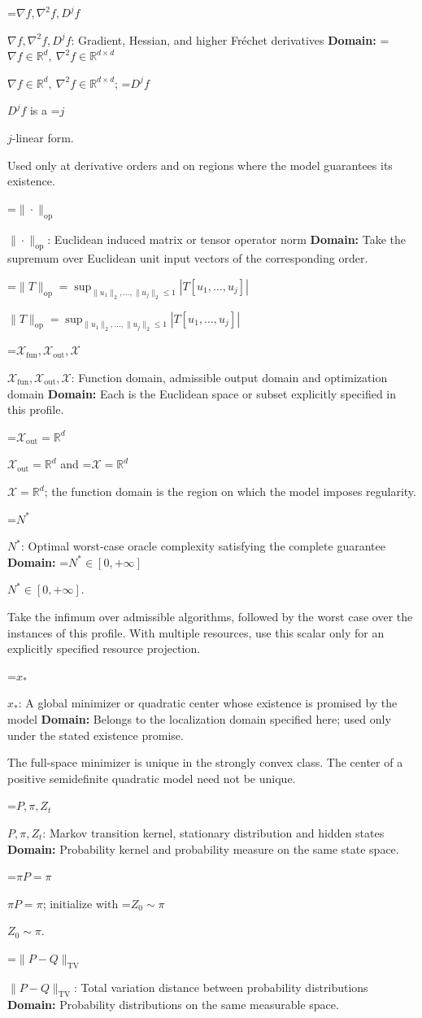 \documentclass[10pt,a4paper]{article}
\newcommand{\AtlasMath}[1]{\par\begingroup\centering\setbox0=\hbox{$\displaystyle #1$}\ifdim\wd0>1.4\linewidth\typeout{ATLAS WIDE FORMULA: \the\wd0}\fi\ifdim\wd0>\linewidth\resizebox{\linewidth}{!}{\box0}\else\box0\fi\par\endgroup}
\newcommand{\AtlasInlineMath}[1]{\begingroup\setbox0=\hbox{$#1$}\ifdim\wd0>.4\linewidth\endgroup\AtlasMath{#1}\else\endgroup$#1$\fi}
\begin{document}
\AtlasInlineMath{\nabla f,\nabla^2f,D^jf}: Gradient, Hessian, and higher Fréchet derivatives \textbf{Domain:} \AtlasInlineMath{\nabla f\in\mathbb{R}^d,\ \nabla^2f\in\mathbb{R}^{d\times d}}; \AtlasInlineMath{D^jf} is a \AtlasInlineMath{j}-linear form.

Used only at derivative orders and on regions where the model guarantees its existence.

\AtlasInlineMath{\|\cdot\|_{\mathrm{op}}}: Euclidean induced matrix or tensor operator norm \textbf{Domain:} Take the supremum over Euclidean unit input vectors of the corresponding order.

\AtlasInlineMath{\|T\|_{\mathrm{op}}=\sup_{\|u_1\|_2,\ldots,\|u_j\|_2\le1}|T[u_1,\ldots,u_j]|}

\AtlasInlineMath{\mathcal{X}_{\mathrm{fun}},\mathcal{X}_{\mathrm{out}},\mathcal{X}}: Function domain, admissible output domain and optimization domain \textbf{Domain:} Each is the Euclidean space or subset explicitly specified in this profile.

\AtlasInlineMath{\mathcal{X}_{\mathrm{out}}=\mathbb{R}^d} and \AtlasInlineMath{\mathcal{X}=\mathbb{R}^d}; the function domain is the region on which the model imposes regularity.

\AtlasInlineMath{N^*}: Optimal worst-case oracle complexity satisfying the complete guarantee \textbf{Domain:} \AtlasInlineMath{N^*\in[0,+\infty]}.

Take the infimum over admissible algorithms, followed by the worst case over the instances of this profile. With multiple resources, use this scalar only for an explicitly specified resource projection.

\AtlasInlineMath{x_*}: A global minimizer or quadratic center whose existence is promised by the model \textbf{Domain:} Belongs to the localization domain specified here; used only under the stated existence promise.

The full-space minimizer is unique in the strongly convex class. The center of a positive semidefinite quadratic model need not be unique.

\AtlasInlineMath{P,\pi,Z_t}: Markov transition kernel, stationary distribution and hidden states \textbf{Domain:} Probability kernel and probability measure on the same state space.

\AtlasInlineMath{\pi P=\pi}; initialize with \AtlasInlineMath{Z_0\sim\pi}.

\AtlasInlineMath{\|P-Q\|_{\mathrm{TV}}}: Total variation distance between probability distributions \textbf{Domain:} Probability distributions on the same measurable space.
\end{document}
